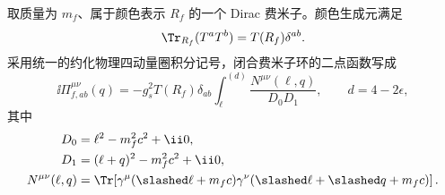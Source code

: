 \begin{derivation}[夸克圈对规范耦合的修正]
取质量为 $m_f$、属于颜色表示 $R_f$ 的一个 Dirac 费米子。颜色生成元满足
\begin{equation*}
 \Tr_{R_f}(T^aT^b)=T(R_f)\delta^{ab}.
\end{equation*}
采用统一的约化物理四动量圈积分记号，闭合费米子环的二点函数写成
\begin{equation*}
 \ii\Pi_{f,ab}^{\mu\nu}(q)
 =-g_s^2T(R_f)\delta_{ab}
 \int_\ell^{(d)}
 \frac{N^{\mu\nu}(\ell,q)}
 {D_0D_1},
 \qquad d=4-2\epsilon,
\end{equation*}
其中
\begin{align*}
 D_0&=\ell^2-m_f^2c^2+\ii0,\\
 D_1&=(\ell+q)^2-m_f^2c^2+\ii0,\\
 N^{\mu\nu}(\ell,q)
 &=\Tr\!\left[
 \gamma^\mu(\slashed\ell+m_fc)
 \gamma^\nu(\slashed\ell+\slashed q+m_fc)
 \right].
\end{align*}


\end{derivation}
